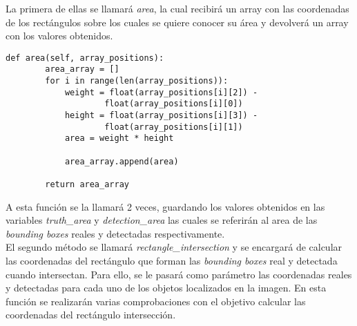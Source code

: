 \documentclass[a4paper, 12pt, spanish, chapterprefix, numbers=noenddot]{book}
\begin{document}
La primera de ellas se llamará \textit{area}, la cual recibirá un array con las coordenadas de los rectángulos sobre los cuales se quiere conocer su área y devolverá un array con los valores obtenidos.\\

\begin{lstlisting}[frame=single]
    def area(self, array_positions):
        area_array = []
        for i in range(len(array_positions)):
            weight = float(array_positions[i][2]) - 
            		float(array_positions[i][0])
            height = float(array_positions[i][3]) -
            		float(array_positions[i][1])
            area = weight * height
         
            area_array.append(area)
            
        return area_array
\end{lstlisting}

A esta función se la llamará 2 veces, guardando los valores obtenidos en las variables \textit{truth\_area} y \textit{detection\_area} las cuales se referirán al area de las \textit{bounding boxes} reales y detectadas respectivamente.\\

El segundo método se llamará \textit{rectangle\_intersection} y se encargará de calcular las coordenadas del rectángulo que forman las \textit{bounding boxes} real y detectada cuando intersectan. Para ello, se le pasará como parámetro las coordenadas reales y detectadas para cada uno de los objetos localizados en la imagen. En esta función se realizarán varias comprobaciones con el objetivo calcular las coordenadas del rectángulo intersección.\\
\end{document}
